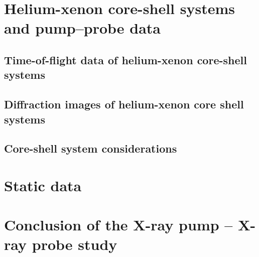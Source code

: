 %
%
%
%
%
%
\section{Helium-xenon core-shell systems and pump--probe data}\label{sec:helium-xenon-data}
%
%
%
\subsection{Time-of-flight data of helium-xenon core-shell systems}
%
%
%
\subsection{Diffraction images of helium-xenon core shell systems}
%
%
%
\subsection{Core-shell system considerations}
%
%
%
\section{Static data}\label{sec:static}
%
%
%
\section{Conclusion of the X-ray pump -- X-ray probe study}
%
%
%
